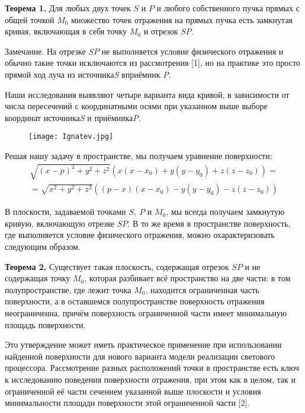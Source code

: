 \textbf{Теорема 1.}
Для любых двух точек $S$ и $P$ и любого собственного пучка прямых с общей точкой $M_0$ множество точек отражения на прямых пучка есть замкнутая кривая, включающая в себя точку $M_0$ и отрезок $SP$.

Замечание. На отрезке $SP$ не выполняется условие физического отражения и обычно такие точки исключаются из рассмотрения [1], но на практике это просто прямой ход луча из источника\textit{S} вприёмник \textit{P}.

Наши исследования выявляют четыре варианта вида кривой, в зависимости от числа пересечений с координатными осями при указанном выше выборе координат источника\textit{S} и приёмника\textit{P}.

\begin{figure}[h]
	\centering
	\texttt{[image: Ignatev.jpg]}
\end{figure}

Решая нашу задачу в пространстве, мы получаем уравнение поверхности:
%
\begin{multline*}
	\sqrt{{\left(x-p\right)}^2+y^2+z^2}\left(x\left(x-x_0\right)+y\left(y-y_0\right)+z\left(z-z_0\right)\right)=
	\\=
	\sqrt{x^2+y^2+z^2}\left(\left(p-x\right)\left(x-x_0\right)-y\left(y-y_0\right)-z\left(z-z_0\right)\right)
\end{multline*}

В плоскости, задаваемой точками $S,\ P$ и $M_0$, мы всегда получаем замкнутую кривую, включающую отрезке $SP$. В то же время в пространстве поверхность, где выполняется условие физического отражения, можно охарактеризовать следующим образом.

\textbf{Теорема 2.}  Существует такая плоскость, содержащая отрезок $SP$ и не содержащая точку $M_0$, которая разбивает всё пространство на две части: в том полупространстве, где лежит точка $M_0$, находится ограниченная часть поверхности, а в оставшемся полупространстве поверхность отражения неограниченна, причём поверхность ограниченной части имеет минимальную площадь поверхности.

Это утверждение может иметь практическое применение при использовании найденной поверхности
для нового варианта модели реализации светового процессора.
Рассмотрение разных
\linebreak
расположений точки в пространстве есть ключ к исследованию поведения поверхности отражения,
при этом как в целом, так и ограниченной её части сечением указанной выше плоскости
и условия минимальности площади поверхности этой ограниченной части [2].


